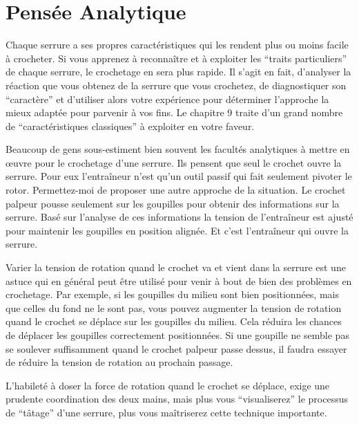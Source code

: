 \documentclass[a4paper,french,11pt,twoside]{report}
\begin{document}
\section{Pensée Analytique}

Chaque serrure a ses propres caractéristiques qui les rendent plus ou moins facile à crocheter. Si vous apprenez à reconnaître et à exploiter les \enquote{traits particuliers} de chaque serrure, le crochetage en sera plus rapide. Il s'agit en fait, d'analyser la réaction que vous obtenez de la serrure que vous crochetez, de diagnostiquer son \enquote{caractère} et d'utiliser alors votre expérience pour déterminer l'approche la mieux adaptée pour parvenir à vos fins. Le chapitre 9 traite d'un grand nombre de \enquote{caractéristiques  classiques} à exploiter en votre faveur.

Beaucoup de gens sous-estiment bien souvent les facultés analytiques à mettre en œuvre pour le crochetage d'une serrure. Ils pensent que seul le crochet ouvre la serrure. Pour eux l'entraîneur n'est qu'un outil passif qui fait seulement pivoter le rotor. Permettez-moi de proposer une autre approche de la situation. Le crochet palpeur pousse seulement sur les goupilles pour obtenir des informations sur la serrure. Basé sur l'analyse de ces informations la tension de l'entraîneur est ajusté pour maintenir les goupilles en position alignée. Et c'est l'entraîneur qui ouvre la serrure.

Varier la tension de rotation quand le crochet va et vient dans la serrure est une astuce qui en général peut être utilisé pour venir à bout de bien des problèmes en crochetage. Par exemple, si les goupilles du milieu sont bien positionnées, mais que celles du fond ne le sont pas, vous pouvez augmenter la tension de rotation quand le crochet se déplace sur les goupilles du milieu. Cela réduira les chances de déplacer les goupilles correctement positionnées. Si une goupille ne semble pas se soulever suffisamment quand le crochet palpeur passe dessus, il faudra essayer de réduire la tension de rotation au prochain passage.

L'habileté à doser la force de rotation quand le crochet se déplace, exige une prudente coordination des deux mains, mais plus vous \enquote{visualiserez} le processus de \enquote{tâtage} d'une serrure, plus vous maîtriserez cette technique importante.

\end{document}
